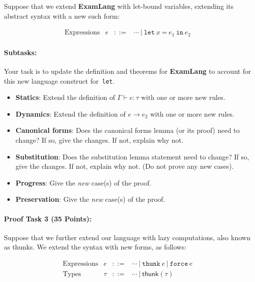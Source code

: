 \documentclass{article}
\newcommand{\stepsto}{\longrightarrow}
\begin{document}
Suppose that we extend \textbf{ExamLang} with let-bound variables,
extending its abstract syntax with a new such form:

\[\begin{array}{ccll}
\textrm{Expressions}  & e & ::= & \cdots ~|~ \texttt{let}~x~\texttt{=}~e_1~\texttt{in}~e_2
\end{array}
\]

\paragraph{Subtasks:}
Your task is to update the definition and theorems for
\textbf{ExamLang} to account for this new language construct for~\texttt{let}.

\begin{itemize}
\item \textbf{Statics}: Extend the definition of $\Gamma \vdash e : \tau$ with one or more new rules.

\item \textbf{Dynamics}: Extend the definition of $e \stepsto e_2$ with one or more new rules.

\item \textbf{Canonical forms}: Does the canonical forms lemma (or its proof) need to
  change? If so, give the changes. If not, explain why not.

\item \textbf{Substitution}: Does the substitution lemma statement
  need to change? If so, give the changes. If not, explain why not.
  (Do not prove any new cases).

\item \textbf{Progress}: Give the \emph{new} case(s) of the proof.

\item \textbf{Preservation}: Give the \emph{new} case(s) of the proof.
\end{itemize}


\paragraph{Proof Task 3 (35 Points):}

Suppose that we further extend our language with lazy computations,
also known as thunks.
%
We extend the syntax with new forms, as follows:

\[\begin{array}{ccll}
\textrm{Expressions}  & e & ::= & \cdots ~|~ \texttt{thunk}~e ~|~ \texttt{force}~e
\\
\textrm{Types}     & \tau & ::= & \cdots ~|~ \textsf{thunk}(\tau)
\end{array}
\]
\end{document}
